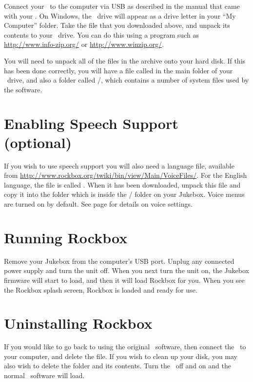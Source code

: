 Connect your \playername\ to the computer via USB as described in the 
manual that came with your \playername. On Windows, the \playername\ drive 
will appear as a drive letter in your ``My Computer'' folder. Take the file 
that you downloaded above, and unpack its contents to your \playername\ drive.
You can do this using a program such as \url{http://www.info-zip.org/} or 
\url{http://www.winzip.org/}.

You will need to unpack all of the files in the archive onto your hard disk. If 
this has been done correctly, you will have a file called 
\fname{\firmwarefilename} in the main folder of your \playername\ drive, and
also a folder called /, which contains a number of system files
used by the software.

\section{Enabling Speech Support (optional)}\label{sec:enabling_speech_support}
If you wish to use speech support you will also need a language file, available
from \url{http://www.rockbox.org/twiki/bin/view/Main/VoiceFiles/}.  For the
English language, the file is called . When it has been
downloaded, unpack this file and copy it into the  folder which is
inside the / folder on your Jukebox. Voice menus are turned on
by default. See page \pageref{ref:Voiceconfiguration} for details on voice
settings.

\section{Running Rockbox}
Remove your Jukebox from the computer's USB port. Unplug any connected power
supply and turn the unit off. When you next turn the unit on, the Jukebox
firmware will start to load, and then it will load Rockbox for you. When you see
the Rockbox splash screen, Rockbox is loaded and ready for use.

\section{Uninstalling Rockbox}
If you would like to go back to using the original \playername\ software, then
connect the \playername\ to your computer, and delete the
\fname{\firmwarefilename} file. If you wish to clean up your disk, you may also
wish to delete the  folder and its contents. Turn the
\playername\ off and on and the normal \playername\ software will load.

